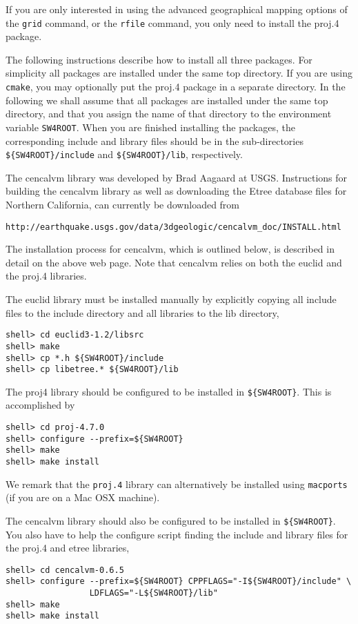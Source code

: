 \documentclass[11pt]{article}
\begin{document}
If you are only interested in using the advanced geographical mapping options of the {\tt grid} command,
or the {\tt rfile} command, you only need to install the proj.4 package.

The following instructions describe how to install all three packages. For simplicity all packages
are installed under the same top directory. If you are using {\tt cmake}, you may optionally put the
proj.4 package in a separate directory. In the following we shall assume that all packages are
installed under the same top directory, and that you assign the name of that directory to the
environment variable \verb+SW4ROOT+. When you are finished installing the packages, the
corresponding include and library files should be in the sub-directories \verb+${SW4ROOT}/include+
and \verb+${SW4ROOT}/lib+, respectively.

The cencalvm library was developed by Brad Aagaard at USGS. Instructions for building the cencalvm
library as well as downloading the Etree database files for Northern California, can
currently be downloaded from
\begin{verbatim}
http://earthquake.usgs.gov/data/3dgeologic/cencalvm_doc/INSTALL.html
\end{verbatim}
The installation process for cencalvm, which is outlined below, is described in detail on the above
web page.  Note that cencalvm relies on both the euclid and the proj.4 libraries.

The euclid library must be installed manually by explicitly copying all include files to
the include directory and all libraries to the lib directory,
\begin{verbatim}
shell> cd euclid3-1.2/libsrc
shell> make
shell> cp *.h ${SW4ROOT}/include
shell> cp libetree.* ${SW4ROOT}/lib
\end{verbatim}
The proj4 library should be configured to be installed in \verb+${SW4ROOT}+. This is accomplished by
\begin{verbatim}
shell> cd proj-4.7.0
shell> configure --prefix=${SW4ROOT}
shell> make
shell> make install
\end{verbatim}
We remark that the {\tt proj.4} library can alternatively be installed using {\tt macports} (if you are
on a Mac OSX machine).

The cencalvm library should also be configured to be installed in \verb+${SW4ROOT}+. You also have to help
the configure script finding the include and library files for the proj.4 and etree libraries,
\begin{verbatim}
shell> cd cencalvm-0.6.5
shell> configure --prefix=${SW4ROOT} CPPFLAGS="-I${SW4ROOT}/include" \
                 LDFLAGS="-L${SW4ROOT}/lib"
shell> make
shell> make install
\end{verbatim}
\end{document}
